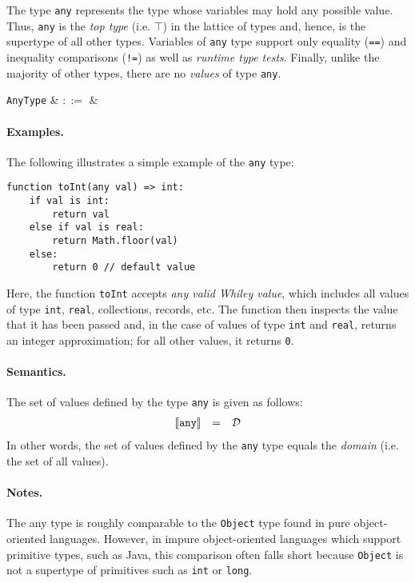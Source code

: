 The type \lstinline{any} represents the type whose variables may hold any possible value.  Thus, \lstinline{any} is the {\em top type} (i.e. $\top$) in the lattice of types and, hence, is the supertype of all other types.  Variables of \lstinline{any} type support only equality (\lstinline{==}) and inequality comparisons (\lstinline{!=}) as well as {\em runtime type tests}.  Finally, unlike the majority of other types, there are no {\em values} of type \lstinline{any}.

\begin{syntax}
  \verb+AnyType+ & $::=$ &  \\
\end{syntax}

\paragraph{Examples.}  The following illustrates a simple example of the \lstinline{any} type:

\begin{lstlisting}
function toInt(any val) => int:
    if val is int:
        return val
    else if val is real:
        return Math.floor(val)
    else:
        return 0 // default value        
\end{lstlisting}

Here, the function \lstinline{toInt} accepts {\em any valid Whiley value}, which includes all values of type \lstinline{int}, \lstinline{real}, collections, records, etc.  The function then inspects the value that it has been passed and, in the case of values of type \lstinline{int} and \lstinline{real}, returns an integer approximation; for all other values, it returns \lstinline{0}.

\paragraph{Semantics.}  The set of values defined by the type \lstinline{any} is given as follows:
\begin{displaymath}
\begin{array}{rcl}
\llbracket{\tt any}\rrbracket & = & \mathcal{D}\\
\end{array}
\end{displaymath}
In other words, the set of values defined by the \lstinline{any} type equals the {\em domain} (i.e. the set of all values).

\paragraph{Notes.}  The any type is roughly comparable to the \lstinline{Object} type found in pure object-oriented languages.  However, in impure object-oriented languages which support primitive types, such as Java, this comparison often falls short because \lstinline{Object} is not a supertype of primitives such as \lstinline{int} or \lstinline{long}.

